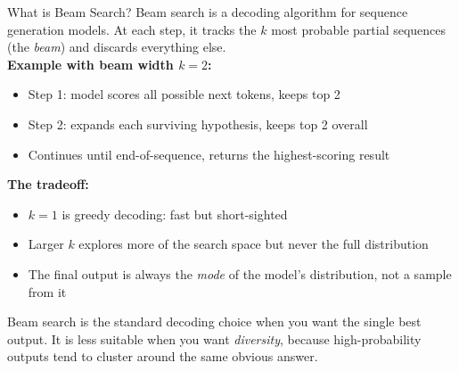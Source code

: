 \documentclass[aspectratio=169]{beamer}
\begin{document}
\begin{frame}{What is Beam Search?}
  Beam search is a decoding algorithm for sequence generation models.
  At each step, it tracks the $k$ most probable partial sequences
  (the \textit{beam}) and discards everything else.\\[1.5em]

  \textbf{Example with beam width $k = 2$:}
  \begin{itemize}
    \item Step 1: model scores all possible next tokens, keeps top 2
    \item Step 2: expands each surviving hypothesis, keeps top 2 overall
    \item Continues until end-of-sequence, returns the highest-scoring result
  \end{itemize}

  \vspace{1em}
  \textbf{The tradeoff:}
  \begin{itemize}
    \item $k = 1$ is greedy decoding: fast but short-sighted
    \item Larger $k$ explores more of the search space but never the full distribution
    \item The final output is always the \emph{mode} of the model's distribution,
      not a sample from it
  \end{itemize}

  \vspace{1em}
  Beam search is the standard decoding choice when you want the
  single best output. It is less suitable when you want \emph{diversity},
  because high-probability outputs tend to cluster around the same obvious answer.
\end{frame}
\end{document}
